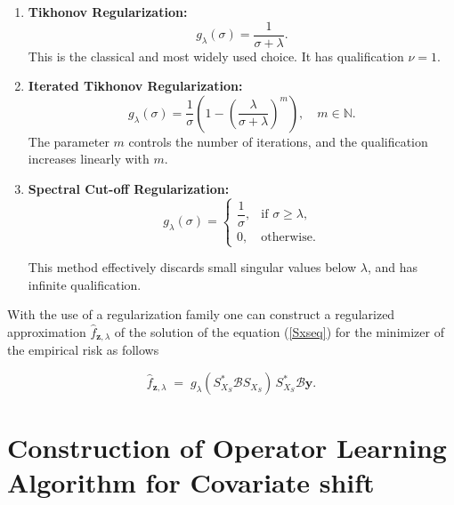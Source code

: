 \documentclass[twoside,11pt]{article}
\begin{document}
\begin{enumerate}
    \item \textbf{Tikhonov Regularization:}
    \[
        g_\lambda(\sigma) = \frac{1}{\sigma + \lambda}.
    \]
    This is the classical and most widely used choice. It has qualification $\nu = 1$.

    \item \textbf{Iterated Tikhonov Regularization:}
    \[
        g_\lambda(\sigma) = \frac{1}{\sigma}
        \left( 1 - \left( \frac{\lambda}{\sigma + \lambda} \right)^{m} \right),
        \quad m \in \mathbb{N}.
    \]
    The parameter $m$ controls the number of iterations, and the qualification increases 
    linearly with $m$.

    \item \textbf{Spectral Cut-off Regularization:}
   \[
        g_\lambda(\sigma) = 
        \begin{cases}
            \dfrac{1}{\sigma}, & \text{if } \sigma \ge \lambda,\\[0.4em]
            0, & \text{otherwise.}
        \end{cases}
    \]


    This method effectively discards small singular values below $\lambda$, and 
    has infinite qualification.
\end{enumerate}


\noindent


With the use of a regularization family one can construct a regularized approximation $\widehat{f}_{\mathbf{z},\lambda}$ of the solution of the equation (\ref{Sxseq}) for the
minimizer of the empirical risk as follows

\begin{equation}\label{equation:genral f_Z}
\widehat{f}_{\mathbf{z},\lambda} \;=\; g_\lambda\left(S_{X_S}^* \mathcal B S_{X_S}\right) \, S_{X_S}^* \mathcal B \mathbf{y}.
\end{equation}


\section{Construction of  Operator Learning Algorithm for Covariate shift}\label{Construction}

   
\noindent
\end{document}
